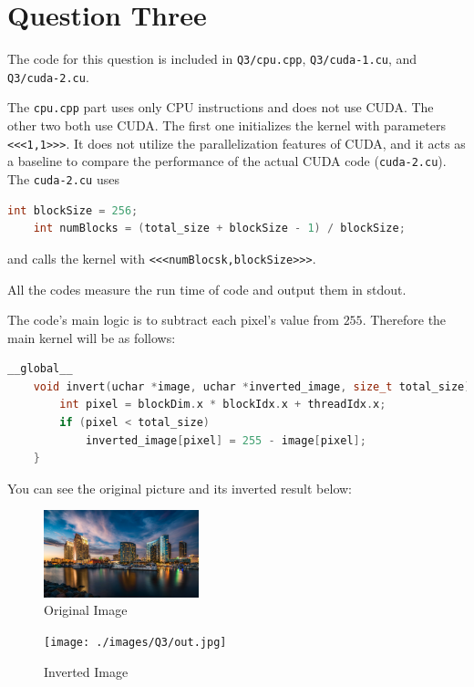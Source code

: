 \documentclass[12pt]{article}
\begin{document}
	
	

	\section{Question Three}
	
	
The code for this question is included in \verb+Q3/cpu.cpp+, \verb+Q3/cuda-1.cu+, and \verb+Q3/cuda-2.cu+.

The \verb+cpu.cpp+ part uses only CPU instructions and does not use CUDA. The other two both use CUDA. The first one initializes the kernel with parameters \verb+<<<1,1>>>+. It does not utilize the parallelization features of CUDA, and it acts as a baseline to compare the performance of the actual CUDA code (\verb+cuda-2.cu+). The \verb+cuda-2.cu+ uses

\begin{lstlisting}[language=c++]
	int blockSize = 256;
	int numBlocks = (total_size + blockSize - 1) / blockSize;
\end{lstlisting}

and calls the kernel with \verb+<<<numBlocsk,blockSize>>>+.

All the codes measure the run time of code and output them in stdout.

The code's main logic is to subtract each pixel's value from $255$. Therefore the main kernel will be as follows:

\begin{lstlisting}[language=c++]
	__global__
	void invert(uchar *image, uchar *inverted_image, size_t total_size) {
		int pixel = blockDim.x * blockIdx.x + threadIdx.x;
		if (pixel < total_size)
			inverted_image[pixel] = 255 - image[pixel];
	}
\end{lstlisting}

You can see the original picture and its inverted result below:


\begin{figure}[H]
	\centering
	\includegraphics[width=0.4\textwidth]{./images/Q3/pic3.jpg}	
	\cprotect\caption{Original Image}
	\label{fig:2-1}
\end{figure}

\begin{figure}[H]
	\centering
	\texttt{[image: ./images/Q3/out.jpg]}	
	\cprotect\caption{Inverted Image}
	\label{fig:2-2}
\end{figure}
\end{document}
